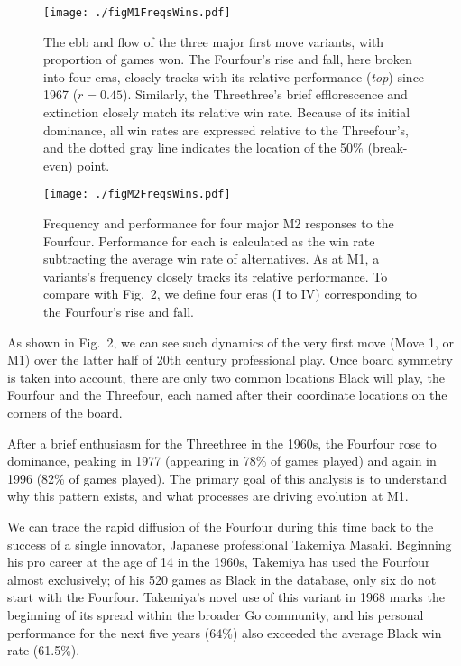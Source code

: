 \documentclass{article}
\begin{document}
\begin{figure}[h!]
\begin{center} 
\texttt{[image: ./figM1FreqsWins.pdf]}
\caption{The ebb and flow of the three major first move variants, with proportion of games won.  The Fourfour's rise and fall, here broken into four eras, closely tracks with its relative performance (\textit{top}) since 1967 ($r=0.45$).  Similarly, the Threethree's brief efflorescence and extinction closely match its relative win rate.  Because of its initial dominance, all win rates are expressed relative to the Threefour's, and the dotted gray line indicates the location of the 50\% (break-even) point.}
\label{FigM1FreqsWins}
\end{center}
\end{figure}

\begin{figure}[h!]
\begin{center} 
\texttt{[image: ./figM2FreqsWins.pdf]}
\caption{Frequency and performance for four major M2 responses to the Fourfour.  Performance for each is calculated as the win rate subtracting the average win rate of alternatives.  As at M1, a variants's frequency closely tracks its relative performance.  To compare with Fig.~2, we define four eras (I to IV) corresponding to the Fourfour's rise and fall.}
\label{FigM2FreqsWins}
\end{center}
\end{figure}

\clearpage

As shown in Fig.~2, we can see such dynamics of the very first move (Move 1, or M1) over the latter half of 20th century professional play.  Once board symmetry is taken into account, there are only two common locations Black will play, the Fourfour and the Threefour, each named after their coordinate locations on the corners of the board. 

After a brief enthusiasm for the Threethree in the 1960s, the Fourfour rose to dominance, peaking in 1977 (appearing in 78\% of games played) and again in 1996 (82\% of games played).  The primary goal of this analysis is to understand why this pattern exists, and what processes are driving evolution at M1.

We can trace the rapid diffusion of the Fourfour during this time back to the success of a single innovator, Japanese professional Takemiya Masaki.  Beginning his pro career at the age of 14 in the 1960s, Takemiya has used the Fourfour almost exclusively; of his 520 games as Black in the database, only six do not start with the Fourfour.  Takemiya's novel use of this variant in 1968 marks the beginning of its spread within the broader Go community, and his personal performance for the next five years (64\%) also exceeded the average Black win rate (61.5\%).  
\end{document}
